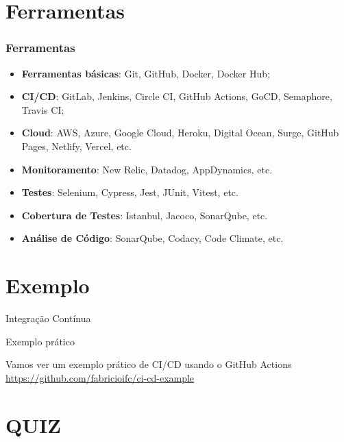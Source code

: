 \documentclass[
	9pt, %
	t, %
]{beamer}
\newcommand{\iconLink}[2]{\href{#1}{\faLink \hspace{0.2em} {#2}}}
\begin{document}
\section{Ferramentas}

\begin{frame}
	\frametitle{Ferramentas}
	\begin{itemize}
		\item \textbf{Ferramentas básicas}: Git, GitHub, Docker, Docker Hub;
		\item \textbf{CI/CD}: GitLab, Jenkins, Circle CI, GitHub Actions, GoCD, Semaphore, Travis CI;
		\item \textbf{Cloud}: AWS, Azure, Google Cloud, Heroku, Digital Ocean, Surge, GitHub Pages, Netlify, Vercel, etc.
		\item \textbf{Monitoramento}: New Relic, Datadog, AppDynamics, etc.
		\item \textbf{Testes}: Selenium, Cypress, Jest, JUnit, Vitest, etc.
		\item \textbf{Cobertura de Testes}: Istanbul, Jacoco, SonarQube, etc.
		\item \textbf{Análise de Código}: SonarQube, Codacy, Code Climate, etc.
	\end{itemize}

\end{frame}

\section{Exemplo}

\begin{frame}
	\begin{center}
		
		\bigskip\bigskip\bigskip\bigskip %
		{\Large Integração Contínua}
		
		\bigskip\bigskip %
		{\Huge Exemplo prático}
		
		\bigskip \bigskip
		{\small Vamos ver um exemplo prático de CI/CD usando o GitHub Actions}\\
		{\small \iconLink{https://github.com/fabricioifc/ci-cd-example}{https://github.com/fabricioifc/ci-cd-example}}
	\end{center}

\end{frame}

\section{QUIZ}
\end{document}
